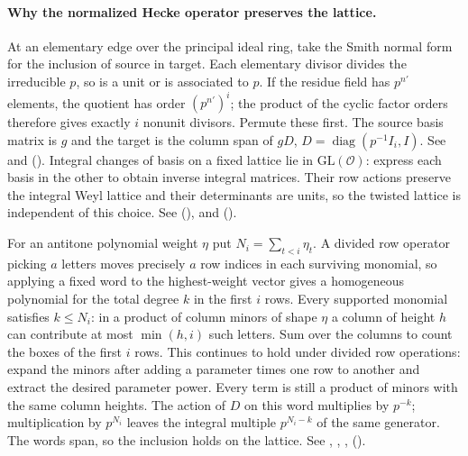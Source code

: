 \paragraph{Why the normalized Hecke operator preserves the lattice.}
At an elementary edge over the principal ideal ring, take the Smith
normal form for the inclusion of source in target. Each elementary
divisor divides the irreducible $p$, so is a unit or is associated to
$p$. If the residue field has $p^{n'}$ elements, the quotient has
order $(p^{n'})^i$; the product of the cyclic factor orders therefore
gives exactly $i$ nonunit divisors. Permute these first. The source
basis matrix is $g$ and the target is the column span of
$gD$, $D=\operatorname{diag}(p^{-1}I_i,I)$.
See  and 
(). Integral changes
of basis on a fixed lattice lie in $\mathrm{GL}(\mathcal O)$:
express each basis in the other to obtain inverse integral matrices.
Their row actions preserve the integral Weyl lattice and their
determinants are units, so the twisted lattice is independent of
this choice. See  (),
 and  ().

For an antitone polynomial weight $\eta$ put $N_i=\sum_{t<i}\eta_t$.
A divided row operator picking $a$ letters moves precisely $a$
row indices in each surviving monomial, so applying a fixed word to
the highest-weight vector gives a homogeneous polynomial for the
total degree $k$ in the first $i$ rows. Every supported monomial
satisfies $k\le N_i$: in a product of column minors of shape $\eta$
a column of height $h$ can contribute at most $\min(h,i)$ such
letters. Sum over the columns to count the boxes of the first $i$
rows. This continues to hold under divided row operations: expand
the minors after adding a parameter times one row to another and
extract the desired parameter power. Every term is still a product
of minors with the same column heights. The action of $D$ on this
word multiplies by $p^{-k}$; multiplication by $p^{N_i}$ leaves the
integral multiple $p^{N_i-k}$ of the same generator. The words
span, so the inclusion holds on the lattice. See ,
, , 
().

